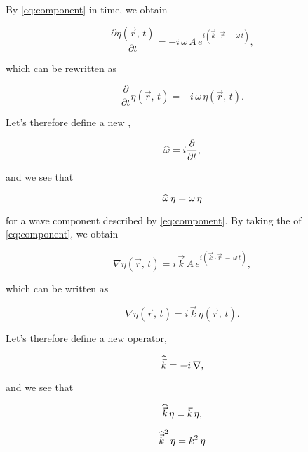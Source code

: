 By  \eqref{eq:component} in time, we obtain

\begin{equation}
\frac{\partial\eta(\vec{r},\,t)}{\partial t} = -i\,\omega\,A\,e^{i(\vec{k}\cdot\vec{r}\,-\,\omega\,t)},
\end{equation}

which can be rewritten as

\begin{equation}
\frac{\partial}{\partial t}\eta(\vec{r},\,t) = -i\,\omega\,\eta(\vec{r},\,t).
\end{equation}

Let's therefore define a new ,

\begin{equation} \label{eq:opomega}
\widehat{\omega} = i\frac{\partial}{\partial t},
\end{equation}

and we see that

\begin{equation} \label{eq:opomegaaction}
\widehat{\omega}\,\eta = \omega\,\eta
\end{equation}

for a wave component described by \eqref{eq:component}. By taking the  of \eqref{eq:component}, we obtain

\begin{equation}
\nabla\eta(\vec{r},\,t) = i\,\vec{k}\,A\,e^{i(\vec{k}\cdot\vec{r}\,-\,\omega\,t)},
\end{equation}

which can be written as

\begin{equation}
\nabla\eta(\vec{r},\,t) = i\,\vec{k}\,\eta(\vec{r},\,t).
\end{equation}

Let's therefore define a new operator,

\begin{equation} \label{eq:opkvec}
\widehat{\vec{k}} = -i\,\nabla,
\end{equation}

and we see that 

\begin{equation} \label{eq:opkvec1action}
\widehat{\vec{k}}\,\eta = \vec{k}\,\eta,
\end{equation}

\begin{equation} \label{eq:opkvec2action}
{\widehat{\vec{k}}}^2\,\eta = k^2\,\eta
\end{equation}

